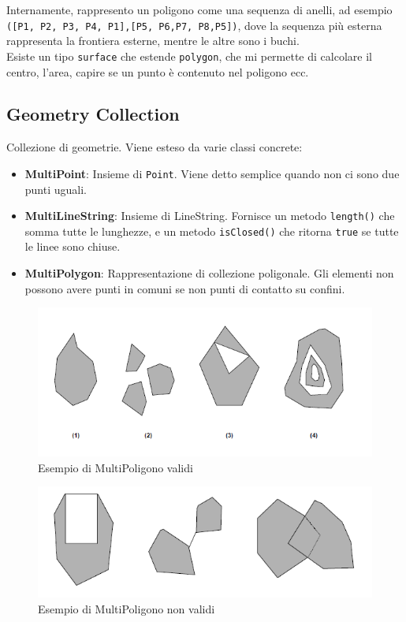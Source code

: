 \documentclass[a4paper,12pt]{article}
\begin{document}
Internamente, rappresento un poligono come una sequenza di anelli, ad esempio \texttt{([P1, P2, P3, P4, P1],[P5, P6,P7, P8,P5])}, dove la sequenza più esterna rappresenta la frontiera esterne, mentre le altre sono i buchi.\\
Esiste un tipo \texttt{surface} che estende \texttt{polygon}, che mi permette di calcolare il centro, l'area, capire se un punto è contenuto nel poligono ecc.

\subsection{Geometry Collection}
Collezione di geometrie. Viene esteso da varie classi concrete:
\begin{itemize}
\item \textbf{MultiPoint}: Insieme di \texttt{Point}. Viene detto semplice quando non ci sono due punti uguali.
\item \textbf{MultiLineString}: Insieme di LineString. Fornisce un metodo \texttt{length()} che somma tutte le lunghezze, e un metodo \texttt{isClosed()} che ritorna \texttt{true} se tutte le linee sono chiuse.
\item \textbf{MultiPolygon}: Rappresentazione di collezione poligonale. Gli elementi non possono avere punti in comuni se non punti di contatto su confini.
\end{itemize}

\begin{figure}[H]
	\centering
	\includegraphics[width=0.5\linewidth]{Immagini/MultiVal}
	\caption{Esempio di MultiPoligono validi}
\end{figure}

\begin{figure}[H]
	\centering
	\includegraphics[width=0.5\linewidth]{Immagini/MultiNVal}
	\caption{Esempio di MultiPoligono non validi}
\end{figure}
\end{document}
